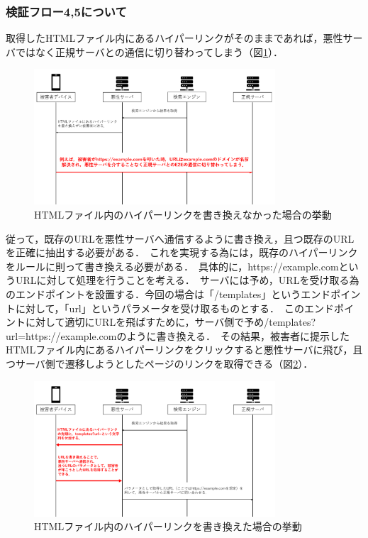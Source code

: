 \documentclass[dvipdfmx,twocolumn]{jsarticle}
\begin{document}
            \subsubsection{検証フロー4,5について}
                取得したHTMLファイル内にあるハイパーリンクがそのままであれば，悪性サーバではなく正規サーバとの通信に切り替わってしまう（図\ref{flow-no45-00}）．\
                \begin{figure}[h]
                    \centering
                    \includegraphics[width=9cm]{img/vc-vf-4-5-00.png}
                    \caption{HTMLファイル内のハイパーリンクを書き換えなかった場合の挙動}
                    \label{flow-no45-00}
                \end{figure}
                従って，既存のURLを悪性サーバへ通信するように書き換え，且つ既存のURLを正確に抽出する必要がある．\
                これを実現する為には，既存のハイパーリンクをルールに則って書き換える必要がある．\
                具体的に，https://example.comというURLに対して処理を行うことを考える．\
                サーバには予め，URLを受け取る為のエンドポイントを設置する．今回の場合は「/templates」というエンドポイントに対して，「url」というパラメータを受け取るものとする．\
                このエンドポイントに対して適切にURLを飛ばすために，サーバ側で予め/templates?url=https://example.comのように書き換える．\
                その結果，被害者に提示したHTMLファイル内にあるハイパーリンクをクリックすると悪性サーバに飛び，且つサーバ側で遷移しようとしたページのリンクを取得できる（図\ref{flow-no45-01}）．
                \begin{figure}[h]
                    \centering
                    \includegraphics[width=9cm]{img/vc-vf-4-5-01.png}
                    \caption{HTMLファイル内のハイパーリンクを書き換えた場合の挙動}
                    \label{flow-no45-01}
                \end{figure}
\end{document}
